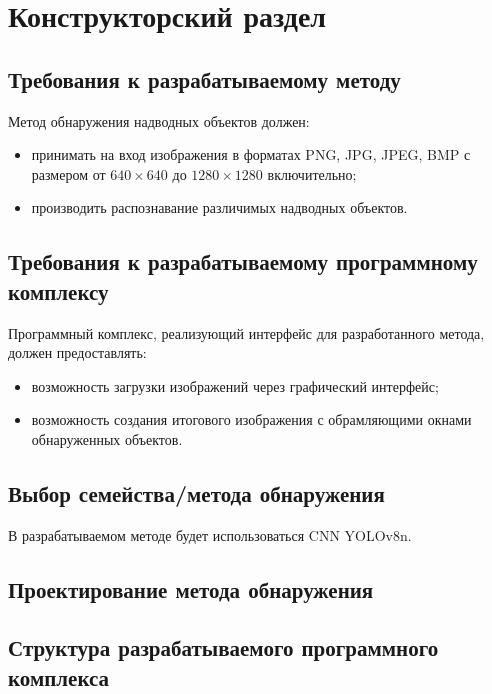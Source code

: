 \chapter{Конструкторский раздел}

\section{Требования к разрабатываемому методу}

Метод обнаружения надводных объектов должен:
\begin{itemize}[label=---]
    \item принимать на вход изображения в форматах PNG, JPG, JPEG, BMP с размером от $640 \times 640$ до $1280 \times 1280$ включительно;
    \item производить распознавание различимых надводных объектов.
\end{itemize}

\section{Требования к разрабатываемому программному комплексу}

Программный комплекс, реализующий интерфейс для разработанного метода, должен предоставлять:
\begin{itemize}[label=---]
    \item возможность загрузки изображений через графический интерфейс;
    \item возможность создания итогового изображения с обрамляющими окнами обнаруженных объектов.
\end{itemize}

\section{Выбор семейства/метода обнаружения}


В разрабатываемом методе будет использоваться CNN YOLOv8n.

\section{Проектирование метода обнаружения}



\section{Структура разрабатываемого программного комплекса}

